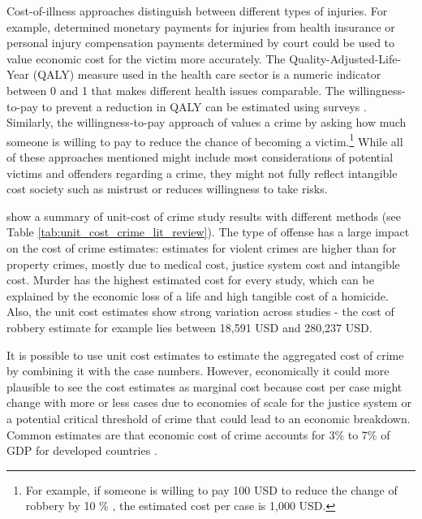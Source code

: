 \documentclass[a4paper,12pt]{article}
\begin{document}
Cost-of-illness approaches distinguish between different types of injuries. For example, determined monetary payments for injuries from health insurance or personal injury compensation payments determined by court could be used to value economic cost for the victim more accurately. 
The Quality-Adjusted-Life-Year (QALY) measure used in the health care sector is a numeric indicator between 0 and 1 that makes different health issues comparable. The willingness-to-pay to prevent a reduction in QALY can be estimated using surveys \citep{entorf}.
Similarly, the willingness-to-pay approach of \citep{cohen2004} values a crime by asking how much someone is willing to pay to reduce the chance of becoming a victim.\footnote{For example, if someone is willing to pay 100 USD to reduce the change of robbery by 10 \% , the estimated cost per case is 1,000 USD.} 
While all of these approaches mentioned might include most considerations of potential victims and offenders regarding a crime, they might not fully reflect intangible cost society such as mistrust or reduces willingness to take risks.

\cite{collister} show a summary of unit-cost of crime study results with different methods (see Table \ref{tab:unit_cost_crime_lit_review}). 
The type of offense has a large impact on the cost of crime estimates: estimates for violent crimes are higher than for property crimes, mostly due to medical cost, justice system cost and intangible cost. Murder has the highest estimated cost for every study, which can be explained by the economic loss of a life and high tangible cost of a homicide. 
Also, the unit cost estimates show strong variation across studies - the cost of robbery estimate for example lies between 18,591 USD and 280,237 USD. 

It is possible to use unit cost estimates to estimate the aggregated cost of crime by combining it with the case numbers. However, economically it could more plausible to see the cost estimates as marginal cost because cost per case might change with more or less cases due to economies of scale for the justice system or a potential critical threshold of crime that could lead to an economic breakdown. Common estimates are that economic cost of crime accounts for 3\% to 7\% of GDP for developed countries \citep{kosten_nutzen_entorf}.
\end{document}
